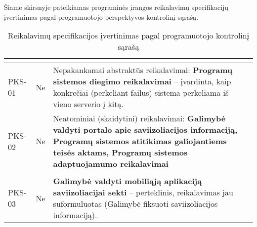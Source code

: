 \documentclass{VUMIFPSkursinis}
\begin{document}
Šiame skirsnyje pateikiamas programinės įrangos reikalavimų specifikacijų įvertinimas pagal programuotojo perspektyvos kontrolinį sąrašą.
\begin{center}

	\begin{longtable}{|C{2cm}|L{2.5cm}|L{10cm}|}

		\caption{Reikalavimų specifikacijos įvertinimas pagal programuotojo kontrolinį sąrašą}
		\label{table:PKS-2}

		\\ \hline
		 &
		 &
		\\ \hline
		PKS-01                                          &
		Ne                                              &
		Nepakankamai abstraktūs reikalavimai: \textbf{Programų sistemos diegimo reikalavimai} -- įvardinta, kaip konkrečiai (perkeliant failus) sistema perkeliama iš vieno serverio į kitą.                                                                               \\ \hline
		PKS-02                                          &
		Ne                                              &
		Neatominiai (skaidytini) reikalavimai: \textbf{Galimybė valdyti portalo apie saviizoliacijos informaciją, Programų sistemos atitikimas galiojantiems teisės aktams, Programų sistemos adaptuojamumo reikalavimai}                                                                                                                                                                                                                            \\ \hline                                                                                                                                                                                                                                           \\ \hline
		PKS-03                                          &
		Ne                                              &
		\textbf{Galimybė valdyti mobiliąją aplikaciją saviizoliacijai sekti} -- perteklinis, reikalavimas jau suformuluotas (Galimybė fiksuoti saviizoliacijos informaciją).                                                                                                                  \\ \hline

\end{longtable}
\end{center}
\end{document}
